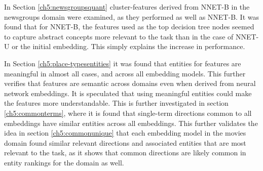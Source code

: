 In Section \ref{ch5:newsgroupsquant} cluster-features derived from NNET-B in the newsgroups domain were examined, as they performed as well as NNET-B. It was found that for NNET-B, the features used as the top decision tree nodes seemed to capture abstract concepts more relevant to the task than in the case of NNET-U or the initial embedding. This simply explains the increase in performance.

In Section \ref{ch5:place-typesentities} it was found that entities for features are meaningful in almost all cases, and across all embedding models. This further verifies that features are semantic across domains even when derived from neural network embeddings. It is speculated that using meaningful entities could make the features more understandable. This is further investigated in section \ref{ch5:commonterms}, where it is found that single-term directions common to all embeddings have similar entities across all embeddings. This further validates the idea in section \ref{ch5:commonunique} that each embedding model in the movies domain found similar relevant directions and associated entities that are most relevant to the task, as it shows that common directions are likely common in entity rankings for the domain as well.

















